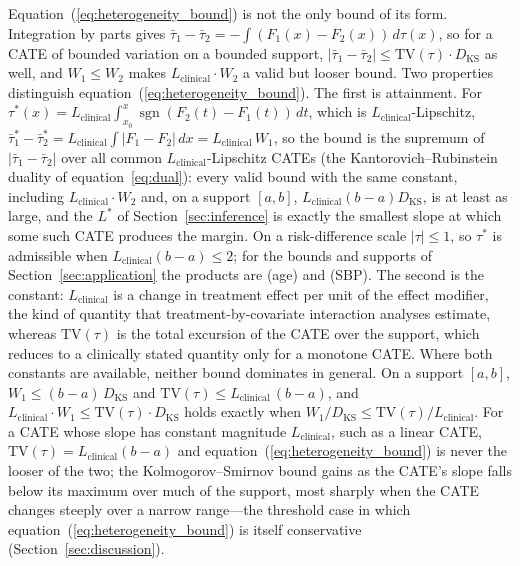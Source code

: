 \documentclass[AMA,Times1COL]{WileyNJDv5}
\begin{document}
\noindent Equation~(\ref{eq:heterogeneity_bound}) is not the only bound of its form. Integration by parts gives $\bar{\tau}_1 - \bar{\tau}_2 = -\int (F_1(x) - F_2(x)) \, d\tau(x)$, so for a CATE of bounded variation on a bounded support, $|\bar{\tau}_1 - \bar{\tau}_2| \leq \mathrm{TV}(\tau) \cdot D_{\text{KS}}$ as well, and $W_1 \leq W_2$ makes $L_{\text{clinical}} \cdot W_2$ a valid but looser bound.\cite{villani2009} Two properties distinguish equation~(\ref{eq:heterogeneity_bound}). The first is attainment. For $\tau^*(x) = L_{\text{clinical}} \int_{x_0}^{x} \operatorname{sgn}(F_2(t) - F_1(t))\,dt$, which is $L_{\text{clinical}}$-Lipschitz, $\bar{\tau}^*_1 - \bar{\tau}^*_2 = L_{\text{clinical}} \int |F_1 - F_2|\,dx = L_{\text{clinical}}\,W_1$, so the bound is the supremum of $|\bar{\tau}_1 - \bar{\tau}_2|$ over all common $L_{\text{clinical}}$-Lipschitz CATEs (the Kantorovich--Rubinstein duality of equation~\ref{eq:dual}): every valid bound with the same constant, including $L_{\text{clinical}} \cdot W_2$ and, on a support $[a, b]$, $L_{\text{clinical}} (b - a) D_{\text{KS}}$, is at least as large, and the $L^*$ of Section~\ref{sec:inference} is exactly the smallest slope at which some such CATE produces the margin. On a risk-difference scale $|\tau| \leq 1$, so $\tau^*$ is admissible when $L_{\text{clinical}} (b - a) \leq 2$; for the bounds and supports of Section~\ref{sec:application} the products are  (age) and  (SBP). The second is the constant: $L_{\text{clinical}}$ is a change in treatment effect per unit of the effect modifier, the kind of quantity that treatment-by-covariate interaction analyses estimate, whereas $\mathrm{TV}(\tau)$ is the total excursion of the CATE over the support, which reduces to a clinically stated quantity only for a monotone CATE. Where both constants are available, neither bound dominates in general. On a support $[a, b]$, $W_1 \leq (b - a)\,D_{\text{KS}}$ and $\mathrm{TV}(\tau) \leq L_{\text{clinical}}\,(b - a)$, and $L_{\text{clinical}} \cdot W_1 \leq \mathrm{TV}(\tau) \cdot D_{\text{KS}}$ holds exactly when $W_1 / D_{\text{KS}} \leq \mathrm{TV}(\tau) / L_{\text{clinical}}$. For a CATE whose slope has constant magnitude $L_{\text{clinical}}$, such as a linear CATE, $\mathrm{TV}(\tau) = L_{\text{clinical}}(b - a)$ and equation~(\ref{eq:heterogeneity_bound}) is never the looser of the two; the Kolmogorov--Smirnov bound gains as the CATE's slope falls below its maximum over much of the support, most sharply when the CATE changes steeply over a narrow range---the threshold case in which equation~(\ref{eq:heterogeneity_bound}) is itself conservative (Section~\ref{sec:discussion}).
\end{document}

